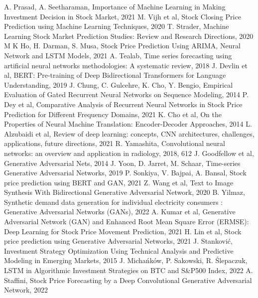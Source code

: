 \documentclass[11pt]{article} %
\begin{document}
\begin{thebibliography}{9}
A. Prasad, A. Seetharaman, Importance of Machine Learning in Making Investment Decision in Stock Market, 2021
M. Vijh et al, Stock Closing Price Prediction using Machine Learning Techniques, 2020
T. Strader, Machine Learning Stock Market Prediction Studies: Review and Research Directions, 2020
M K Ho, H. Darman, S. Musa,  Stock Price Prediction Using ARIMA, Neural Network and LSTM Models, 2021
A. Tealab, Time series forecasting using artificial neural networks methodologies: A systematic review, 2018
J. Devlin et al, BERT: Pre-training of Deep Bidirectional Transformers for Language Understanding, 2019
J. Chung, C. Gulcehre, K. Cho, Y. Bengio, Empirical Evaluation of Gated Recurrent Neural Networks on Sequence Modeling, 2014
P. Dey et al, Comparative Analysis of Recurrent Neural Networks in Stock Price Prediction for Different Frequency Domains, 2021 
K. Cho et al, On the Properties of Neural Machine Translation: Encoder-Decoder Approaches, 2014
L. Alzubaidi et al, Review of deep learning: concepts, CNN architectures, challenges, applications, future directions, 2021
R. Yamashita, Convolutional neural networks: an overview and application in radiology, 2018, 612
J. Goodfellow et al, Generative Adversarial Nets, 2014
J. Yoon, D. Jarret, M. Schaar, Time-series Generative Adversarial Networks, 2019
P. Sonkiya, V. Bajpai, A. Bansal, Stock price prediction using BERT and GAN, 2021
Z. Wang et al, Text to Image Synthesis With Bidirectional Generative Adversarial Network, 2020
B. Yilmaz, Synthetic demand data generation for individual electricity consumers : Generative Adversarial Networks (GANs), 2022
A. Kumar et al, Generative Adversarial Network (GAN) and Enhanced Root Mean Square Error (ERMSE): Deep Learning for Stock Price Movement Prediction, 2021
H. Lin et al, Stock price prediction using Generative Adversarial Networks, 2021 
J. Stanković, Investment Strategy Optimization Using Technical Analysis and Predictive Modeling in Emerging Markets, 2015
J. Michańków, P. Sakowski, R. Ślepaczuk, LSTM in Algorithmic Investment Strategies on BTC and S\&P500 Index, 2022
A. Staffini, Stock Price Forecasting by a Deep Convolutional Generative Adversarial Network, 2022

\end{thebibliography}
\end{document}
